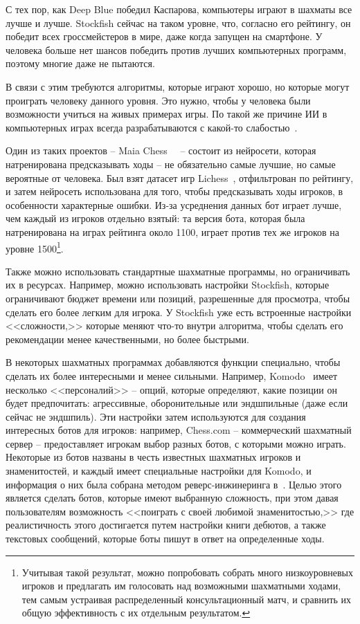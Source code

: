\documentclass{article}
\begin{document}
С тех пор, как Deep Blue победил Каспарова,
компьютеры играют в шахматы все лучше и лучше.
Stockfish сейчас на таком уровне,
что, согласно его рейтингу,
он победит всех гроссмейстеров в мире,
даже когда запущен на смартфоне.
У человека больше нет шансов победить против лучших компьютерных программ,
поэтому многие даже не пытаются.

В связи с этим требуются алгоритмы,
которые играют хорошо, но которые могут проиграть человеку данного уровня.
Это нужно, чтобы у человека были возможности учиться на живых примерах игры.
По такой же причине ИИ в компьютерных играх всегда разрабатываются
с какой-то слабостью~\cite{gmtk-ai}.

Один из таких проектов -- Maia Chess~\cite{maia-chess-article}~\cite{maia-chess-repo} -- 
состоит из нейросети, которая натренирована предсказывать ходы --
не обязательно самые лучшие, но самые вероятные от человека.
Был взят датасет игр Lichess~\cite{lichess-dataset},
отфильтрован по рейтингу,
и затем нейросеть использована для того, чтобы предсказывать ходы игроков,
в особенности характерные ошибки.
Из-за усреднения данных бот играет лучше, чем каждый из игроков отдельно взятый:
та версия бота, которая была натренирована на играх рейтинга около 1100,
играет против тех же игроков на уровне 1500\footnote{
    Учитывая такой результат, можно попробовать собрать много низкоуровневых игроков
    и предлагать им голосовать над возможными шахматными ходами,
    тем самым устраивая распределенный консультационный матч,
    и сравнить их общую эффективность с их отдельным результатом.
}.

Также можно использовать стандартные шахматные программы,
но ограничивать их в ресурсах.
Например, можно использовать настройки Stockfish,
которые ограничивают бюджет времени или позиций,
разрешенные для просмотра,
чтобы сделать его более легким для игрока.
У Stockfish уже есть встроенные настройки <<сложности,>>
которые меняют что-то внутри алгоритма,
чтобы сделать его рекомендации менее качественными,
но более быстрыми.

В некоторых шахматных программах добавляются функции специально,
чтобы сделать их более интересными и менее сильными.
Например, Komodo~\cite{komodo-engine} имеет несколько <<персоналий>> --
опций, которые определяют, какие позиции он будет предпочитать: агрессивные,
оборонительные или эндшпильные (даже если сейчас не эндшпиль).
Эти настройки затем используются для создания интересных ботов для игроков:
например, Chess.com -- коммерческий шахматный сервер --
предоставляет игрокам выбор разных ботов, с которыми можно играть.
Некоторые из ботов названы в честь известных шахматных игроков и знаменитостей,
и каждый имеет специальные настройки для Komodo, и информация о них была собрана методом реверс-инжинеринга в~\cite{chesscom-bot-info}.
Целью этого является сделать ботов, которые имеют
выбранную сложность, при этом давая пользователям возможность
<<поиграть с своей любимой знаменитостью,>>
где реалистичность этого достигается путем настройки книги дебютов,
а также текстовых сообщений, которые боты пишут в ответ на определенные ходы.
\end{document}
